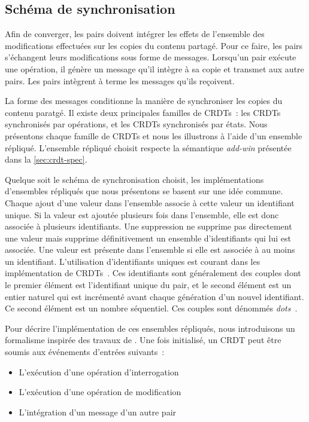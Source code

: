 \subsection{Schéma de synchronisation}\label{sec:crdt-sync}

Afin de converger, les pairs doivent intégrer les effets de l'ensemble des modifications effectuées sur les copies du contenu partagé.
Pour ce faire, les pairs s'échangent leurs modifications sous forme de messages.
Lorsqu'un pair exécute une opération, il génère un message qu'il intègre à sa copie et transmet aux autre pairs.
Les pairs intègrent à terme les messages qu'ils reçoivent.

La forme des messages conditionne la manière de synchroniser les copies du contenu paratgé.
Il existe deux principales familles de \acp{CRDT}~: les \acp{CRDT} synchronisés par opérations, et les \acp{CRDT} synchronisés par états.
Nous présentons chaque famille de \acp{CRDT} et nous les illustrons à l'aide d'un ensemble répliqué.
L'ensemble répliqué choisit respecte la sémantique \emph{add-win} présentée dans la \autoref{sec:crdt-spec}.

Quelque soit le schéma de synchronisation choisit, les implémentations d'ensembles répliqués que nous présentons se basent sur une idée commune.
Chaque ajout d'une valeur dans l'ensemble associe à cette valeur un identifiant unique.
Si la valeur est ajoutée plusieurs fois dans l'ensemble, elle est donc associée à plusieurs identifiants.
Une suppression ne supprime pas directement une valeur mais supprime définitivement un ensemble d'identifiants qui lui est associée.
Une valeur est présente dans l'ensemble si elle est associée à au moins un identifiant.
L'utilisation d'identifiants uniques est courant dans les implémentation de \acp{CRDT}~\autocite{baquero_2018_pure-op-crdt,almeida_2018_delta-crdt-revisited}.
Ces identifiants sont généralement des couples dont le premier élément est l'identifiant unique du pair, et le second élément est un entier naturel qui est incrémenté avant chaque génération d'un nouvel identifiant.
Ce second élément est un nombre séquentiel.
Ces couples sont dénommés \emph{dots}~\autocite{baquero_2018_pure-op-crdt}.

Pour décrire l'implémentation de ces ensembles répliqués, nous introduisons un formalisme inspirée des travaux de \textcite{baquero_2018_pure-op-crdt}.
Une fois initialisé, un \ac{CRDT} peut être soumis aux événements d'entrées suivants~:
\begin{itemize}
\item L'exécution d'une opération d'interrogation
\item L'exécution d'une opération de modification
\item L'intégration d'un message d'un autre pair
\end{itemize}

